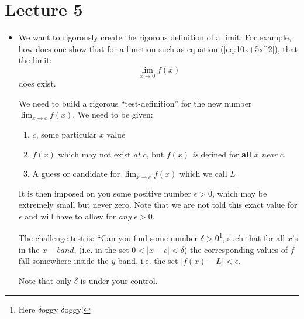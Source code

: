 \section{Lecture 5}
\begin{itemize}
    \item We want to rigorously create the rigorous definition of a limit. For example, how does one show that for a function such as equation (\ref{eq:10x+5x^2}), that the limit:
    \begin{equation}
        \lim_{x\to 0} f(x)
        \label{eq:}
    \end{equation}
    does exist.
    \begin{idea}
        We need to build a rigorous ``test-definition'' for the new number $\displaystyle \lim_{x\to c} f(x)$. We need to be given:
        \begin{enumerate}
            \item $c$, some particular $x$ value
            \item $f(x)$ which may not exist \textit{at} $c$, but $f(x)$ \emph{is} defined for \textbf{all} $x$ \textit{near} $c$.
            \item A guess or candidate for $\displaystyle \lim_{x\to c}f(x)$ which we call $L$
        \end{enumerate}
        It is then imposed on you some positive number $\epsilon>0$, which may be extremely small but never zero. Note that we are not told this exact value for $\epsilon$ and will have to allow for \textit{any} $\epsilon>0$.
        \vspace{2mm}

        The challenge-test is: ``Can you find some number $\delta>0$\footnote{Here $\delta$oggy $\delta$oggy!}, such that for all $x$'s in the $x-band$, (i.e. in the set $0<|x-c|<\delta$) the corresponding values of $f$ fall somewhere inside the $y$-band, i.e. the set $|f(x)-L|<\epsilon$.
        \vspace{2mm}

        Note that only $\delta$ is under your control.
    \end{idea}
\end{itemize}